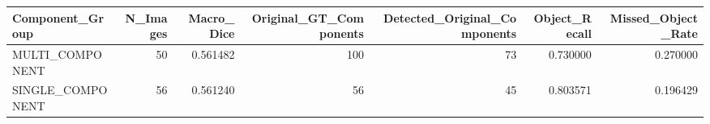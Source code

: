 \begin{tabular}{lrrrrrr}
\toprule
Component_Group & N_Images & Macro_Dice & Original_GT_Components & Detected_Original_Components & Object_Recall & Missed_Object_Rate \\
\midrule
MULTI_COMPONENT & 50 & 0.561482 & 100 & 73 & 0.730000 & 0.270000 \\
SINGLE_COMPONENT & 56 & 0.561240 & 56 & 45 & 0.803571 & 0.196429 \\
\bottomrule
\end{tabular}
